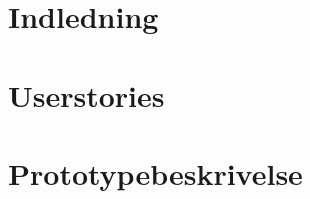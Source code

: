 \documentclass[10pt,a4paper]{article}
\begin{document}
\thispagestyle{plain}



\setcounter{page}{1}
\def\emptyline{\vspace{12pt}}

\section*{Indledning}


\section*{Userstories}


\section*{Prototypebeskrivelse}

\end{document}
